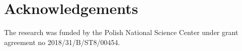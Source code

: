 \documentclass[b5paper, 11pt, titlepage]{book}
\begin{document}
\section*{Acknowledgements}

The research was funded by the Polish National Science Center under grant agreement no 2018/31/B/ST8/00454.




\end{document}
